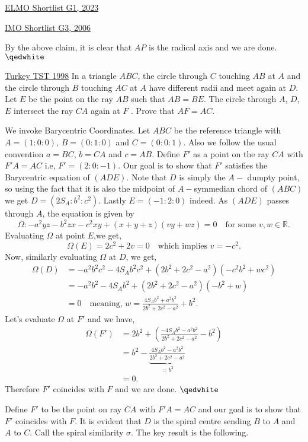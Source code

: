 \begin{problem}{14}{\href{https://artofproblemsolving.com/community/c6h3100572p28033718}{ELMO Shortlist G1, 2023}}
\begin{problem}{8}{\href{https://artofproblemsolving.com/community/q2h130813p35493023}{IMO Shortlist G3, 2006}}
\begin{solution}
	By the above claim, it is clear that $AP$ is the radical axis and we are done. $\qedwhite$
	\end{solution}
\end{problem}

\begin{problem}{9}{\href{https://artofproblemsolving.com/community/q2h449171p35492771}{Turkey TST 1998}} In a triangle $ABC$, the circle through $C$ touching $AB$ at $A$ and the circle through $B$ touching $AC$ at $A$ have diﬀerent radii and meet again at $D$. Let $E$ be the point on the ray $AB$ such that $AB = BE$. The circle through $A$, $D$, $E$ intersect the ray $CA$ again at $F$ . Prove that $AF = AC$.
	\begin{numsolution}{1} We invoke Barycentric Coordinates. Let $ABC$ be the reference triangle with $A=(1:0:0)$, $B=(0:1:0)$ and $C=(0:0:1)$. Also we follow the usual convention $a=BC$, $b=CA$ and $c=AB$. Define $F'$ as a point on the ray $CA$ with $F'A=AC$ i.e, $F'=(2:0:-1)$. Our goal is to show that $F'$ satisfies the Barycentric equation of $(ADE)$.
Note that $D$ is simply the $A-$ dumpty point, so using the fact that it is also the midpoint of $A-$symmedian chord of $(ABC)$ we get $D=(2S_A: b^2:c^2)$. Lastly $E=(-1:2:0)$ indeed. As $(ADE)$ passes through $A$, the equation is given by
$$\Omega: -a^2yz-b^2zx-c^2xy+(x+y+z)(vy+wz)=0\quad\text{for some $v,w\in\mathbb{R}$.}$$Evaluating $\Omega$ at point $E$,we get,
$$\Omega(E)=2c^2+2v=0\quad\text{which implies $v=-c^2$.}$$Now, similarly evaluating $\Omega$ at $D$, we get,
\begin{align*} \Omega(D)&=-a^2b^2c^2-4S_Ab^2c^2+(2b^2+2c^2-a^2)(-c^2b^2+wc^2)\\ &=-a^2b^2-4S_Ab^2+(2b^2+2c^2-a^2)(-b^2+w)\\ &=0 \quad\text{meaning, $w=\frac{4S_Ab^2+a^2b^2}{2b^2+2c^2-a^2}+b^2$.} \end{align*}Let's evaluate $\Omega$ at $F'$ and we have,
\begin{align*} \Omega(F')&=2b^2+\left(\frac{-4S_Ab^2-a^2b^2}{2b^2+2c^2-a^2}-b^2\right)\\ &=b^2-\underbrace{\frac{4S_Ab^2-a^2b^2}{2b^2+2c^2-a^2}}_{=b^2}\\ &=0. \end{align*}Therefore $F'$ coincides with $F$ and we are done. $\qedwhite$
	\end{numsolution}
	
	\begin{numsolution}{2} Define $F'$ to be the point on ray $CA$ with $F'A=AC$ and our goal is to show that $F'$ coincides with $F$. It is evident that $D$ is the spiral centre sending $B$ to $A$ and $A$ to $C$. Call the spiral similarity $\sigma$. The key result is the following.


\end{numsolution}
\end{problem}
\end{problem}
